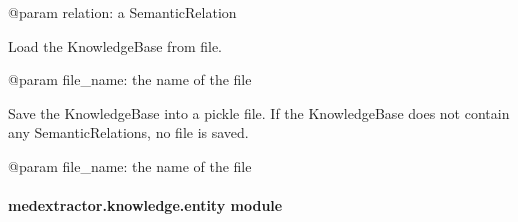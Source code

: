 \documentclass[letterpaper,10pt,english]{sphinxmanual}
\begin{document}
\begin{fulllineitems}
\begin{fulllineitems}
\sphinxAtStartPar
@param relation: a SemanticRelation

\end{fulllineitems}


\begin{fulllineitems}
\label{\detokenize{medextractor.knowledge:medextractor.knowledge.base.KnowledgeBase.load}}
\pysigstartsignatures
{}
\pysigstopsignatures
\sphinxAtStartPar
Load the KnowledgeBase from file.

\sphinxAtStartPar
@param file\_name: the name of the file

\end{fulllineitems}


\begin{fulllineitems}
\label{\detokenize{medextractor.knowledge:medextractor.knowledge.base.KnowledgeBase.save}}
\pysigstartsignatures
{}
\pysigstopsignatures
\sphinxAtStartPar
Save the KnowledgeBase into a pickle file.
If the KnowledgeBase does not contain any SemanticRelations, no file is saved.

\sphinxAtStartPar
@param file\_name: the name of the file

\end{fulllineitems}


\end{fulllineitems}



\paragraph{medextractor.knowledge.entity module}
\label{\detokenize{medextractor.knowledge:module-medextractor.knowledge.entity}}\label{\detokenize{medextractor.knowledge:medextractor-knowledge-entity-module}}
\end{document}

